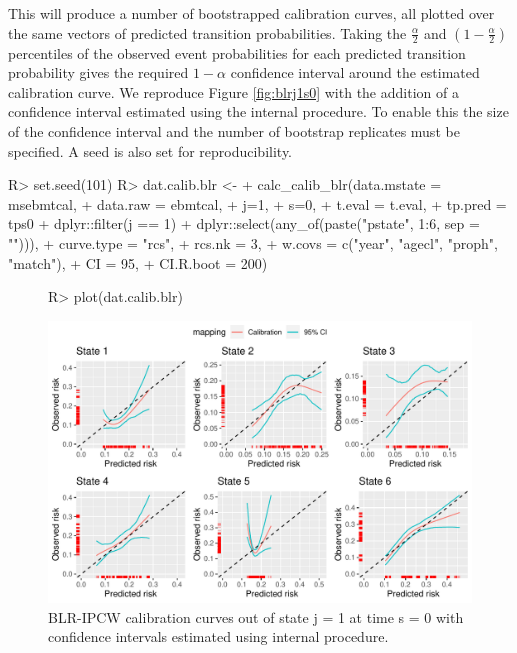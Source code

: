 \documentclass[nojss]{jss}
\begin{document}
This will produce a number of bootstrapped calibration curves, all plotted over the same vectors of predicted transition probabilities. Taking the $\frac{\alpha}{2}$ and $\left(1-\frac{\alpha}{2}\right)$ percentiles of the observed event probabilities for each predicted transition probability gives the required $1-\alpha$ confidence interval around the estimated calibration curve. We reproduce Figure \ref{fig:blrj1s0} with the addition of a confidence interval estimated using the internal procedure. To enable this the size of the confidence interval  and the number of bootstrap replicates  must be specified. A seed is also set for reproducibility.

\begin{Schunk}
\begin{Sinput}
R> set.seed(101)
R> dat.calib.blr <-
+    calc_calib_blr(data.mstate = msebmtcal,
+                   data.raw = ebmtcal,
+                   j=1,
+                   s=0,
+                   t.eval = t.eval,
+                   tp.pred = tps0 %
+                     dplyr::filter(j == 1) %
+                     dplyr::select(any_of(paste("pstate", 1:6, sep = ""))),
+                   curve.type = "rcs",
+                   rcs.nk = 3,
+                   w.covs = c("year", "agecl", "proph", "match"),
+                   CI = 95,
+                   CI.R.boot = 200)
\end{Sinput}
\end{Schunk}

\begin{figure}
\centering
\begin{Schunk}
\begin{Sinput}
R> plot(dat.calib.blr)
\end{Sinput}
\end{Schunk}
\includegraphics{overview-014}
\caption{\label{fig:blrj1s0ci} BLR-IPCW calibration curves out of state j =  1 at time s = 0 with confidence intervals estimated using internal procedure.}
\end{figure}
\end{document}
